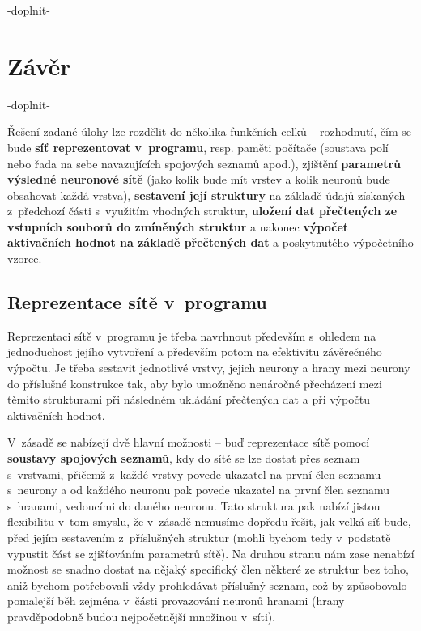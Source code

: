 \documentclass[11pt]{article}
\begin{document}
-doplnit-

\newpage

\section{Závěr}

-doplnit-

\newpage




Řešení zadané úlohy lze rozdělit do několika funkčních celků – rozhodnutí, čím se bude \textbf{síť reprezentovat v~programu}, resp. paměti počítače (soustava polí nebo řada na sebe navazujících spojových seznamů apod.), zjištění \textbf{parametrů výsledné neuronové sítě} (jako kolik bude mít vrstev a kolik neuronů bude obsahovat každá vrstva), \textbf{sestavení její struktury} na základě údajů získaných z~předchozí části s~využitím vhodných struktur, \textbf{uložení dat přečtených ze vstupních souborů do zmíněných struktur} a nakonec \textbf{výpočet aktivačních hodnot na základě přečtených dat} a poskytnutého výpočetního vzorce.

\subsection{Reprezentace sítě v~programu}
Reprezentaci sítě v~programu je třeba navrhnout především s~ohledem na jednoduchost jejího vytvoření a především potom na efektivitu závěrečného výpočtu. Je třeba sestavit jednotlivé vrstvy, jejich neurony a hrany mezi neurony do příslušné konstrukce tak, aby bylo umožněno nenáročné přecházení mezi těmito strukturami při následném ukládání přečtených dat a při výpočtu aktivačních hodnot.

V~zásadě se nabízejí dvě hlavní možnosti – buď reprezentace sítě pomocí \textbf{soustavy spojových seznamů}, kdy do sítě se lze dostat přes seznam s~vrstvami, přičemž z~každé vrstvy povede ukazatel na první člen seznamu s~neurony a od každého neuronu pak povede ukazatel na první člen seznamu s~hranami, vedoucími do daného neuronu. Tato struktura pak nabízí jistou flexibilitu v~tom smyslu, že v~zásadě nemusíme dopředu řešit, jak velká síť bude, před jejím sestavením z~příslušných struktur (mohli bychom tedy v~podstatě vypustit část se zjišťováním parametrů sítě). Na druhou stranu nám zase nenabízí možnost se snadno dostat na nějaký specifický člen některé ze struktur bez toho, aniž bychom potřebovali vždy prohledávat příslušný seznam, což by způsobovalo pomalejší běh zejména v~části provazování neuronů hranami (hrany pravděpodobně budou nejpočetnější množinou v~síti).
\end{document}
